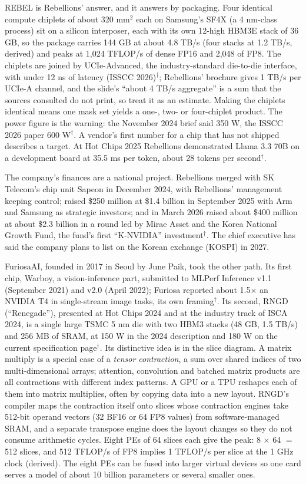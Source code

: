 \documentclass[11pt,letterpaper]{article}
\begin{document}
REBEL is Rebellions' answer, and it answers by packaging. Four identical compute chiplets of about 320 mm$^2$ each on Samsung's SF4X (a 4 nm-class process) sit on a silicon interposer, each with its own 12-high HBM3E stack of 36 GB, so the package carries 144 GB at about 4.8 TB/s (four stacks at 1.2 TB/s, derived) and peaks at 1{,}024 TFLOP/s of dense FP16 and 2{,}048 of FP8. The chiplets are joined by UCIe-Advanced, the industry-standard die-to-die interface, with under 12 ns of latency (ISSCC 2026)$^\dagger$; Rebellions' brochure gives 1 TB/s per UCIe-A channel, and the slide's ``about 4 TB/s aggregate'' is a sum that the sources consulted do not print, so treat it as an estimate. Making the chiplets identical means one mask set yields a one-, two- or four-chiplet product. The power figure is the warning: the November 2024 brief said 350 W, the ISSCC 2026 paper 600 W$^\dagger$. A vendor's first number for a chip that has not shipped describes a target. At Hot Chips 2025 Rebellions demonstrated Llama 3.3 70B on a development board at 35.5 ms per token, about 28 tokens per second$^\dagger$.

The company's finances are a national project. Rebellions merged with SK Telecom's chip unit Sapeon in December 2024, with Rebellions' management keeping control; raised \$250 million at \$1.4 billion in September 2025 with Arm and Samsung as strategic investors; and in March 2026 raised about \$400 million at about \$2.3 billion in a round led by Mirae Asset and the Korea National Growth Fund, the fund's first ``K-NVIDIA'' investment$^\dagger$. The chief executive has said the company plans to list on the Korean exchange (KOSPI) in 2027.

FuriosaAI, founded in 2017 in Seoul by June Paik, took the other path. Its first chip, Warboy, a vision-inference part, submitted to MLPerf Inference v1.1 (September 2021) and v2.0 (April 2022); Furiosa reported about 1.5$\times$ an NVIDIA T4 in single-stream image tasks, its own framing$^\dagger$. Its second, RNGD (``Renegade''), presented at Hot Chips 2024 and at the industry track of ISCA 2024, is a single large TSMC 5 nm die with two HBM3 stacks (48 GB, 1.5 TB/s) and 256 MB of SRAM, at 150 W in the 2024 description and 180 W on the current specification page$^\dagger$. Its distinctive idea is in the slice diagram. A matrix multiply is a special case of a \emph{tensor contraction}, a sum over shared indices of two multi-dimensional arrays; attention, convolution and batched matrix products are all contractions with different index patterns. A GPU or a TPU reshapes each of them into matrix multiplies, often by copying data into a new layout. RNGD's compiler maps the contraction itself onto slices whose contraction engines take 512-bit operand vectors (32 BF16 or 64 FP8 values) from software-managed SRAM, and a separate transpose engine does the layout changes so they do not consume arithmetic cycles. Eight PEs of 64 slices each give the peak: 8 $\times$ 64 $=$ 512 slices, and 512 TFLOP/s of FP8 implies 1 TFLOP/s per slice at the 1 GHz clock (derived). The eight PEs can be fused into larger virtual devices so one card serves a model of about 10 billion parameters or several smaller ones.
\end{document}
